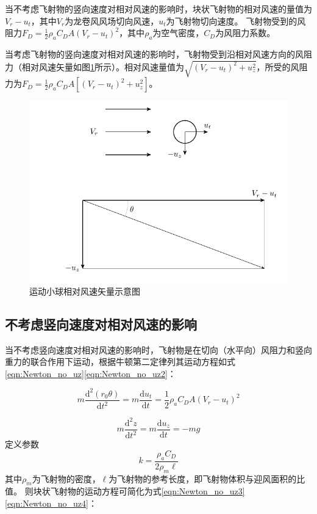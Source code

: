 \documentclass{ctexart}
\begin{document}
当不考虑飞射物的竖向速度对相对风速的影响时，块状飞射物的相对风速的量值为$V_r-u_t$，其中$V_r$为龙卷风风场切向风速，$u_t$为飞射物切向速度。
飞射物受到的风阻力$F_D=\frac{1}{2}\rho_a C_D A \left( V_r - u_t \right)^2 $，其中$\rho_a$为空气密度，$C_D$为风阻力系数。

当考虑飞射物的竖向速度对相对风速的影响时，飞射物受到沿相对风速方向的风阻力（相对风速矢量如图\ref{fig:relative_velocity}所示）。相对风速量值为$\sqrt{(V_r-u_t)^2+u_z^2}$，所受的风阻力为$F_D=\frac{1}{2} \rho_a C_D A \left[(V_r-u_t)^2+u_z^2\right] $。

\begin{figure}[h]
\centering
\includegraphics{./fig/relative_velocity}
\caption{运动小球相对风速矢量示意图}
\label{fig:relative_velocity}
\end{figure}

\subsection{不考虑竖向速度对相对风速的影响}
当不考虑竖向速度对相对风速的影响时，飞射物是在切向（水平向）风阻力和竖向重力的联合作用下运动，根据牛顿第二定律列其运动方程如式\eqref{eqn:Newton_no_uz}\eqref{eqn:Newton_no_uz2}：

\begin{equation}
  \label{eqn:Newton_no_uz}
      m\frac{\mathrm{d}^2 \left(r_0 \theta \right)}{\mathrm{d} t^2} = m\frac{\mathrm{d} u_t}{\mathrm{d} t} = \frac{1}{2} \rho_a C_D A \left(V_r-u_t\right)^2
\end{equation}

\begin{equation}
  \label{eqn:Newton_no_uz2}
  m\frac{\mathrm{d}^2 z}{\mathrm{d} t^2} = m\frac{\mathrm{d} u_z}{\mathrm{d} t } = -mg
\end{equation}
定义参数
\begin{equation}
k=\frac{\rho_a C_D}{2 \rho_m \ell}
\end{equation}
其中$\rho_m$为飞射物的密度，$\ell$为飞射物的参考长度，即飞射物体积与迎风面积的比值。
则块状飞射物的运动方程可简化为式\eqref{eqn:Newton_no_uz3}\eqref{eqn:Newton_no_uz4}：
\end{document}
